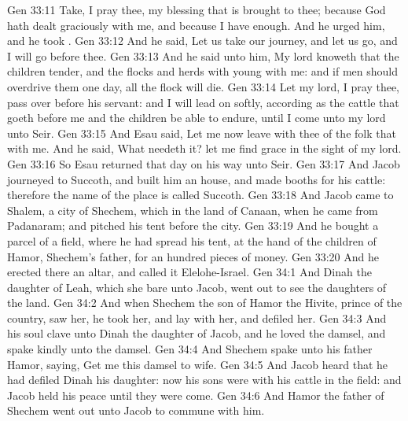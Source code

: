 \vs Gen 33:11 Take, I pray thee, my blessing that is brought to thee; because God hath dealt graciously with me, and because I have enough. And he urged him, and he took .
\vs Gen 33:12 And he said, Let us take our journey, and let us go, and I will go before thee.
\vs Gen 33:13 And he said unto him, My lord knoweth that the children  tender, and the flocks and herds with young  with me: and if men should overdrive them one day, all the flock will die.
\vs Gen 33:14 Let my lord, I pray thee, pass over before his servant: and I will lead on softly, according as the cattle that goeth before me and the children be able to endure, until I come unto my lord unto Seir.
\vs Gen 33:15 And Esau said, Let me now leave with thee  of the folk that  with me. And he said, What needeth it? let me find grace in the sight of my lord.
\vs Gen 33:16 So Esau returned that day on his way unto Seir.
\vs Gen 33:17 And Jacob journeyed to Succoth, and built him an house, and made booths for his cattle: therefore the name of the place is called Succoth.
\vs Gen 33:18 And Jacob came to Shalem, a city of Shechem, which  in the land of Canaan, when he came from Padanaram; and pitched his tent before the city.
\vs Gen 33:19 And he bought a parcel of a field, where he had spread his tent, at the hand of the children of Hamor, Shechem's father, for an hundred pieces of money.
\vs Gen 33:20 And he erected there an altar, and called it Elelohe-Israel.
\vs Gen 34:1 And Dinah the daughter of Leah, which she bare unto Jacob, went out to see the daughters of the land.
\vs Gen 34:2 And when Shechem the son of Hamor the Hivite, prince of the country, saw her, he took her, and lay with her, and defiled her.
\vs Gen 34:3 And his soul clave unto Dinah the daughter of Jacob, and he loved the damsel, and spake kindly unto the damsel.
\vs Gen 34:4 And Shechem spake unto his father Hamor, saying, Get me this damsel to wife.
\vs Gen 34:5 And Jacob heard that he had defiled Dinah his daughter: now his sons were with his cattle in the field: and Jacob held his peace until they were come.
\vs Gen 34:6 And Hamor the father of Shechem went out unto Jacob to commune with him.
